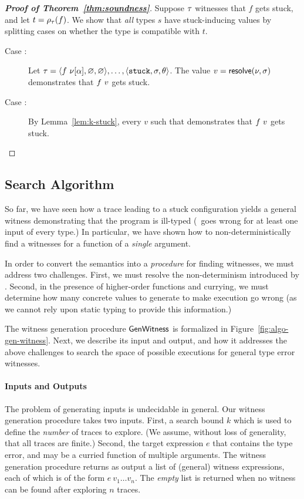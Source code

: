 \begin{proof}[\textbf{Proof of Theorem~\ref{thm:soundness}}]
%
Suppose $\tau$ witnesses that $f$ gets stuck,
and let $t = \rho_{\tau}(f)$.
We show that \emph{all} types $s$ have stuck-inducing
values by splitting cases on whether the type is
compatible with $t$. %
%
\begin{description}
\item [Case :]
  Let $\tau = \langle f\ \nu[\alpha], \varnothing, \varnothing \rangle,\ldots,\langle \mathtt{stuck}, \sigma, \theta \rangle$.
  The value $v = \mathsf{resolve}(\nu, \sigma)$ demonstrates that
  $f\ v$ gets stuck.
\item [Case :] By Lemma~\ref{lem:k-stuck}, every $v$
  such that  demonstrates that $f\ v$ gets stuck.
\end{description}
\end{proof}

\subsection{Search Algorithm}
\label{sec:search-algorithm}
%
So far, we have seen how a trace leading to a stuck configuration yields
a general witness demonstrating that the program is ill-typed (\ie\ goes
wrong for at least one input of every type.)
In particular, we have shown how to non-deterministically find a witnesses
for a function of a \emph{single} argument.

In order to convert the semantics into a \emph{procedure} for finding
witnesses, we must address two challenges.
%
First, we must resolve the non-determinism introduced by \gensym.
%
Second, in the presence of higher-order functions and currying,
we must determine how many concrete values to generate to make
execution go wrong (as we cannot rely upon static typing to
provide this information.)

The witness generation procedure $\mathsf{GenWitness}$ is formalized in
Figure~\ref{fig:algo-gen-witness}.
%
Next, we describe its input and output, and how it
addresses the above challenges to search the space of possible
executions for general type error witnesses.

\paragraph{Inputs and Outputs}
%
The problem of generating inputs is undecidable in general.
%
Our witness generation procedure takes two inputs.
%
First, a search bound $k$ which is used to define the \emph{number} of
traces to explore. (We assume, without loss of generality, that all
traces are finite.)
%
Second, the target expression $e$ that contains the type error,
and may be a curried function of multiple arguments.
%
The witness generation procedure returns as output a list of (general)
witness expressions, each of which is of the form $e\ v_1 \ldots v_n$.
%
The \emph{empty} list is returned when no witness can be found after
exploring $n$ traces.


